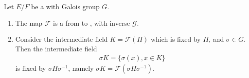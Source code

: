 \documentclass{article}
\begin{document}
\begin{thma}\label{thm:oqnedarr}
Let $E / F$ be a  with Galois group $G$.
\begin{enumerate}
    \item The map $\mathcal{F}$ is a  from  to , with inverse $\mathcal{G}$.
    \item  Consider the intermediate field $K=\mathcal{F}(H)$ which is fixed by $H$, and $\sigma \in G$. Then the intermediate field
\begin{align*}
\sigma K=\{\sigma(x), x \in K\}
\end{align*}
is fixed by $\sigma H \sigma^{-1}$, namely $\sigma K=\mathcal{F}\left(\sigma H \sigma^{-1}\right)$.
\end{enumerate}
\end{thma} 
\end{document}
